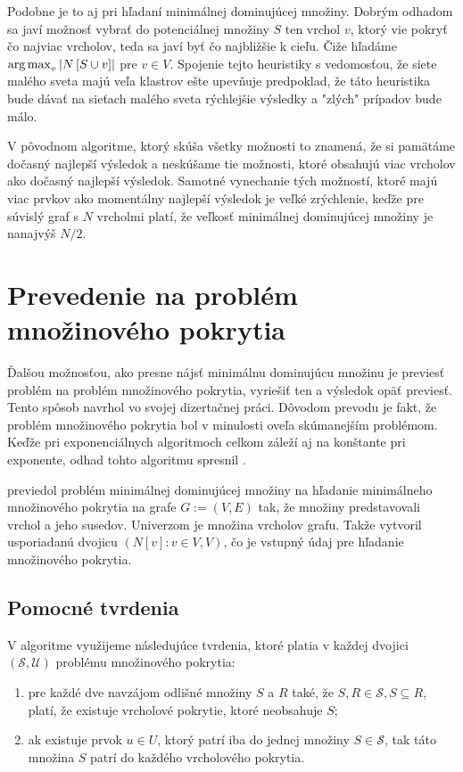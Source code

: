 Podobne je to aj pri hľadaní minimálnej dominujúcej množiny. Dobrým odhadom sa 
javí možnosť vybrať do potenciálnej množiny $S$ ten vrchol $v$, ktorý vie 
pokryť čo najviac vrcholov, teda sa javí byť čo najbližšie k cieľu. Čiže hľadáme 
$\operatorname*{arg\,max}_v \left|N\left[S \cup {v}\right]\right|$ pre $v \in V$. Spojenie 
tejto heuristiky s vedomosťou, že siete malého sveta majú veľa klastrov ešte 
upevňuje predpoklad, že táto heuristika bude dávať na sieťach malého sveta 
rýchlejšie výsledky a "zlých" prípadov bude málo.

V pôvodnom algoritme, ktorý skúša všetky možnosti to znamená, že si pamätáme 
dočasný najlepší výsledok a neskúšame tie možnosti, ktoré obsahujú viac vrcholov 
ako dočasný najlepší výsledok. Samotné vynechanie tých možností, ktoré majú viac 
prvkov ako momentálny najlepší výsledok je veľké zrýchlenie, keďže pre súvislý 
graf s $N$ vrcholmi platí, že veľkosť minimálnej dominujúcej množiny je nanajvýš 
${N}\!/{2}$.


\section{Prevedenie na problém množinového pokrytia}

Ďalšou možnosťou, ako presne nájsť minimálnu dominujúcu množinu je previesť 
problém na problém množinového pokrytia, vyriešiť ten a výsledok opäť previesť.
Tento spôsob navrhol \citet{grandoni04} vo svojej dizertačnej práci. Dôvodom 
prevodu je fakt, že problém množinového pokrytia bol v minulosti oveľa 
skúmanejším problémom.
Keďže pri exponenciálnych algoritmoch celkom záleží aj na konštante pri 
exponente, odhad tohto algoritmu spresnil \citet{fomin05}. 

\citet{grandoni04} previedol problém minimálnej dominujúcej množiny na 
hľadanie minimálneho množinového pokrytia na grafe $G := (V, E)$ tak, že 
množiny predstavovali vrchol a jeho susedov. Univerzom je množina vrcholov 
grafu. Takže vytvoril usporiadanú dvojicu $({N[v] : v \in V }, V)$, čo je 
vstupný údaj pre hľadanie množinového pokrytia.

\subsection{Pomocné tvrdenia}

V algoritme využijeme následujúce tvrdenia, ktoré platia v každej dvojici 
$(\mathcal{S}, \mathcal{U})$ problému množinového pokrytia:
\begin{enumerate}
	\item pre každé dve navzájom odlišné množiny $S$ a $R$ také, že 
		$S, R \in \mathcal{S}, S \subseteq R$, platí, že existuje vrcholové 
		pokrytie, ktoré neobsahuje $S$;
	\item ak existuje prvok $u \in U$, ktorý patrí iba do jednej množiny 
		$S \in \mathcal{S}$, tak táto množina $S$ patrí do každého vrcholového 
		pokrytia.
\end{enumerate}

